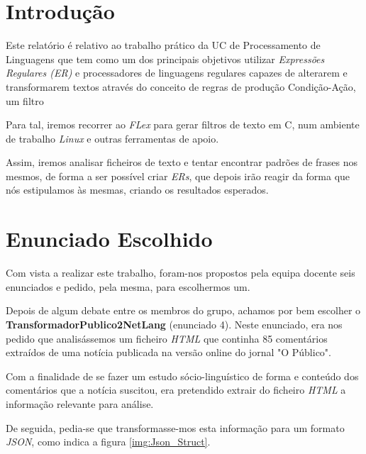 \documentclass[a4paper,12pt]{report}
\begin{document}

\tableofcontents
\clearpage


\chapter{Introdução}

Este relatório é relativo ao trabalho prático da UC de Processamento de Linguagens que tem como um dos principais objetivos utilizar \textit{Expressões Regulares (ER)} e processadores de linguagens regulares capazes de alterarem e transformarem textos através do conceito de regras de produção Condição-Ação, um filtro 

Para tal, iremos recorrer ao \textit{FLex} para gerar filtros de texto em C, num ambiente de trabalho \textit{Linux} e outras ferramentas de apoio. 

Assim, iremos analisar ficheiros de texto e tentar encontrar padrões de frases nos mesmos, de forma a ser possível criar \textit{ERs}, que depois irão reagir da forma que nós estipulamos às mesmas, criando os resultados esperados.


\chapter{Enunciado Escolhido}

Com vista a realizar este trabalho, foram-nos propostos pela equipa docente seis enunciados e pedido, pela mesma, para escolhermos um. 
\par Depois de algum debate entre os membros do grupo, achamos por bem escolher o \textbf{TransformadorPublico2NetLang} (enunciado 4). Neste enunciado, era nos pedido que analisássemos um ficheiro \textit{HTML} que continha 85 comentários extraídos de uma notícia publicada na versão online do jornal "O Público". 

Com a finalidade de se fazer um estudo sócio-linguístico de forma e conteúdo dos comentários que a notícia suscitou, era pretendido extrair do ficheiro \textit{HTML} a informação relevante para análise. 

De seguida, pedia-se que transformasse-mos esta informação para um formato \textit{JSON}, como indica a figura \ref{img:Json_Struct}.
\end{document}
